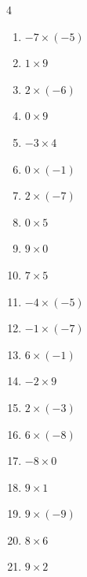 \begin{multicols}{4}
\begin{enumerate}
  \item $-7\times (-5)$
        \phantom{$=35$}

  \item $1\times 9$
        \phantom{$=9$}

  \item $2\times (-6)$
        \phantom{$=-12$}

  \item $0\times 9$
        \phantom{$=0$}

  \item $-3\times 4$
        \phantom{$=-12$}

  \item $0\times (-1)$
        \phantom{$=0$}

  \item $2\times (-7)$
        \phantom{$=-14$}

  \item $0\times 5$
        \phantom{$=0$}

  \item $9\times 0$
        \phantom{$=0$}

  \item $7\times 5$
        \phantom{$=35$}

  \item $-4\times (-5)$
        \phantom{$=20$}

  \item $-1\times (-7)$
        \phantom{$=7$}

  \item $6\times (-1)$
        \phantom{$=-6$}

  \item $-2\times 9$
        \phantom{$=-18$}

  \item $2\times (-3)$
        \phantom{$=-6$}

  \item $6\times (-8)$
        \phantom{$=-48$}

  \item $-8\times 0$
        \phantom{$=0$}

  \item $9\times 1$
        \phantom{$=9$}

  \item $9\times (-9)$
        \phantom{$=-81$}

  \item $8\times 6$
        \phantom{$=48$}

  \item $9\times 2$
        \phantom{$=18$}


\end{enumerate}
\end{multicols}
